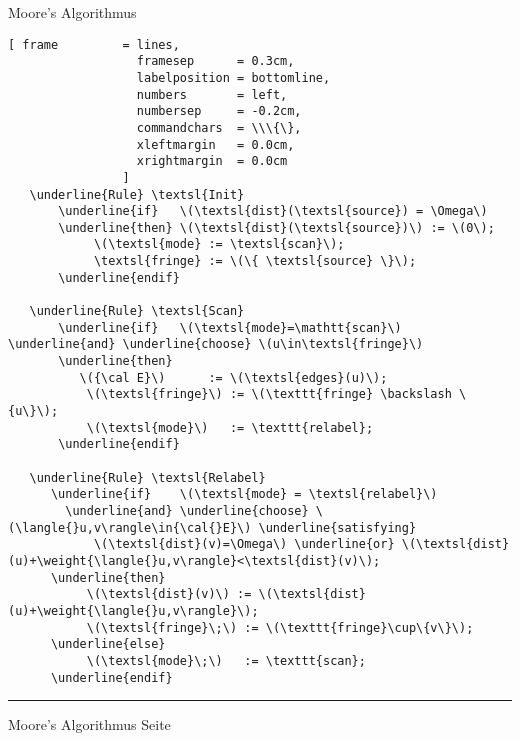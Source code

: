 \documentclass{slides}
\newcommand{\weight}[1]{\|#1\|}
\newcounter{mypage}
\begin{document}
\begin{slide}{}
\normalsize

\begin{center}
 Moore's Algorithmus
\end{center}
\vspace*{0.5cm}

\footnotesize
\begin{Verbatim}[ frame         = lines, 
                  framesep      = 0.3cm, 
                  labelposition = bottomline,
                  numbers       = left,
                  numbersep     = -0.2cm,
                  commandchars  = \\\{\},
                  xleftmargin   = 0.0cm,
                  xrightmargin  = 0.0cm
                ]
   \underline{Rule} \textsl{Init}
       \underline{if}   \(\textsl{dist}(\textsl{source}) = \Omega\)
       \underline{then} \(\textsl{dist}(\textsl{source})\) := \(0\);
            \(\textsl{mode} := \textsl{scan}\);
            \textsl{fringe} := \(\{ \textsl{source} \}\);
       \underline{endif}
       
   \underline{Rule} \textsl{Scan}
       \underline{if}   \(\textsl{mode}=\mathtt{scan}\) \underline{and} \underline{choose} \(u\in\textsl{fringe}\) 
       \underline{then}
          \({\cal E}\)      := \(\textsl{edges}(u)\);
           \(\textsl{fringe}\) := \(\texttt{fringe} \backslash \{u\}\);
           \(\textsl{mode}\)   := \texttt{relabel};
       \underline{endif}

   \underline{Rule} \textsl{Relabel}
      \underline{if}    \(\textsl{mode} = \textsl{relabel}\)
        \underline{and} \underline{choose} \(\langle{}u,v\rangle\in{\cal{}E}\) \underline{satisfying}  
            \(\textsl{dist}(v)=\Omega\) \underline{or} \(\textsl{dist}(u)+\weight{\langle{}u,v\rangle}<\textsl{dist}(v)\);
      \underline{then}
           \(\textsl{dist}(v)\) := \(\textsl{dist}(u)+\weight{\langle{}u,v\rangle}\);
           \(\textsl{fringe}\;\) := \(\texttt{fringe}\cup\{v\}\);
      \underline{else} 
           \(\textsl{mode}\;\)   := \texttt{scan};
      \underline{endif}
\end{Verbatim}


\vspace*{\fill}
\tiny \addtocounter{mypage}{1}
\rule{17cm}{1mm}
Moore's Algorithmus \hspace*{\fill} Seite 
\end{slide}


\end{document}
